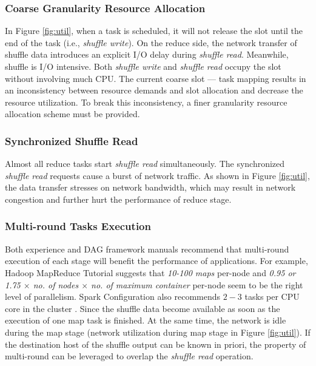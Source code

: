 \subsubsection{Coarse Granularity Resource Allocation}
In Figure \ref{fig:util}, when a task is scheduled, it will not release the slot until the end of the task (i.e., \textit{shuffle write}). On the reduce side, the network transfer of shuffle data introduces an explicit I/O delay during \textit{shuffle read}. Meanwhile, shuffle is I/O intensive. Both \textit{shuffle write} and \textit{shuffle read} occupy the slot without involving much CPU. The current coarse slot --- task mapping results in an inconsistency between resource demands and slot allocation and decrease the resource utilization. To break this inconsistency, a finer granularity resource allocation scheme must be provided.

\subsubsection{Synchronized Shuffle Read}
Almost all reduce tasks start \textit{shuffle read} simultaneously. The synchronized \textit{shuffle read} requests cause a burst of network traffic. As shown in Figure \ref{fig:util}, the data transfer stresses on network bandwidth, which may result in network congestion and further hurt the performance of reduce stage.

\subsubsection{Multi-round Tasks Execution}\label{multi}
Both experience and DAG framework manuals recommend that multi-round execution of each stage will benefit the performance of applications.
For example, Hadoop MapReduce Tutorial \cite{hadooptutorial} suggests that \textit{10-100 maps} per-node and \textit{0.95 or 1.75 $\times$ no. of nodes $\times$ no. of maximum container} per-node seem to be the right level of parallelism. Spark Configuration also recommends $2-3$ tasks per CPU core in the cluster \cite{sparkconf}.
Since the shuffle data become available as soon as the execution of one map task is finished. At the same time, the network is idle during the map stage (network utilization during map stage in Figure \ref{fig:util}). If the destination host of the shuffle output can be known in priori, the property of multi-round can be leveraged to overlap the \textit{shuffle read} operation.

